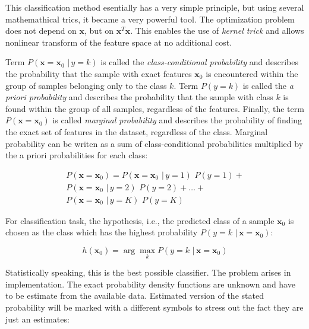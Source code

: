 \documentclass{article}
\newcommand{\argmax}{\arg\!\max} %
\begin{document}
This classification method esentially has a very simple principle, but using several mathemathical trics, it became a very powerful tool. The optimization problem does not depend on $\mathbf{x}$, but on $\mathbf{x}^T\mathbf{x}$. This enables the use of \emph{kernel trick} and allows nonlinear transform of the feature space at no additional cost. 













Term $P(\mathbf{x}=\mathbf{x}_0  \,\, | \, y=k)$ is called the \emph{class-conditional probability} and describes the probability that the sample with exact features $\mathbf{x}_0$ is encountered within the group of samples belonging only to the class $k$. Term $P(y=k)$ is called the \emph{a priori probability} and describes the probability that the sample with class $k$ is found within the group of all samples, regardless of the features. Finally, the term $P(\mathbf{x}=\mathbf{x}_0)$ is called \emph{marginal probability} and describes the probability of finding the exact set of features in the dataset, regardless of the class. Marginal probability can be writen as a sum of class-conditional probabilities multiplied by the a priori probabilities for each class:

\begin{equation}
\begin{split}
P(\mathbf{x}=\mathbf{x}_0) = P(\mathbf{x}=\mathbf{x}_0  \,\, | \, y=1) \,\,P(y=1) + \\
P(\mathbf{x}=\mathbf{x}_0  \,\, | \, y=2) \,\,P(y=2) + \dots + \\
P(\mathbf{x}=\mathbf{x}_0  \,\, | \, y=K) \,\,P(y=K)
\end{split}
\end{equation}

For classification task, the hypothesis, i.e., the predicted class of a sample $\mathbf{x}_0$ is chosen as the class which has the highest probability $P(y=k \,\, | \, \mathbf{x}=\mathbf{x}_0)$:

\begin{equation} 
h(\mathbf{x}_0) = \argmax_k P(y=k \,\, | \, \mathbf{x}=\mathbf{x}_0)
\end{equation}

Statistically speaking, this is the best possible classifier. The problem arises in implementation. The exact probability density functions are unknown and have to be estimate from the available data.
Estimated version of the stated probability will be marked with a different symbols to stress out the fact they are just an estimates:
\end{document}
